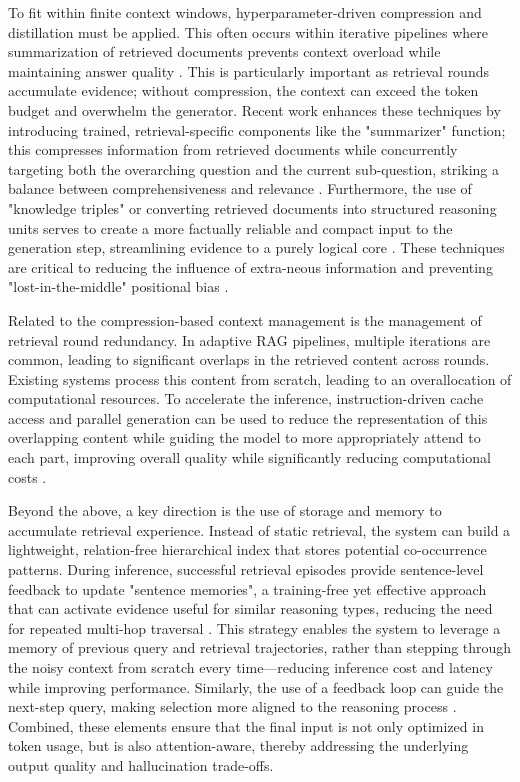 \documentclass[11pt,a4paper]{article}
\begin{document}
To fit within finite context windows, hyperparameter-driven compression and distillation must be applied. This often occurs within iterative pipelines where summarization of retrieved documents prevents context overload while maintaining answer quality \cite{arxiv:2407.13101v1}. This is particularly important as retrieval rounds accumulate evidence; without compression, the context can exceed the token budget and overwhelm the generator. Recent work enhances these techniques by introducing trained, retrieval-specific components like the "summarizer" function; this compresses information from retrieved documents while concurrently targeting both the overarching question and the current sub-question, striking a balance between comprehensiveness and relevance \cite{arxiv:2407.13101v1}. Furthermore, the use of "knowledge triples" or converting retrieved documents into structured reasoning units serves to create a more factually reliable and compact input to the generation step, streamlining evidence to a purely logical core \cite{arxiv:2502.18397v1,arxiv:2604.14170v1}. These techniques are critical to reducing the influence of extra-neous information and preventing "lost-in-the-middle" positional bias \cite{arxiv:2408.08067v2}.

Related to the compression-based context management is the management of retrieval round redundancy. In adaptive RAG pipelines, multiple iterations are common, leading to significant overlaps in the retrieved content across rounds. Existing systems process this content from scratch, leading to an overallocation of computational resources. To accelerate the inference, instruction-driven cache access and parallel generation can be used to reduce the representation of this overlapping content while guiding the model to more appropriately attend to each part, improving overall quality while significantly reducing computational costs \cite{arxiv:2505.12731v2}.

Beyond the above, a key direction is the use of storage and memory to accumulate retrieval experience. Instead of static retrieval, the system can build a lightweight, relation-free hierarchical index that stores potential co-occurrence patterns. During inference, successful retrieval episodes provide sentence-level feedback to update "sentence memories", a training-free yet effective approach that can activate evidence useful for similar reasoning types, reducing the need for repeated multi-hop traversal \cite{arxiv:2603.01783v1}. This strategy enables the system to leverage a memory of previous query and retrieval trajectories, rather than stepping through the noisy context from scratch every time---reducing inference cost and latency while improving performance. Similarly, the use of a feedback loop can guide the next-step query, making selection more aligned to the reasoning process \cite{arxiv:2604.14170v1,arxiv:2503.23095v1}. Combined, these elements ensure that the final input is not only optimized in token usage, but is also attention-aware, thereby addressing the underlying output quality and hallucination trade-offs.
\end{document}
